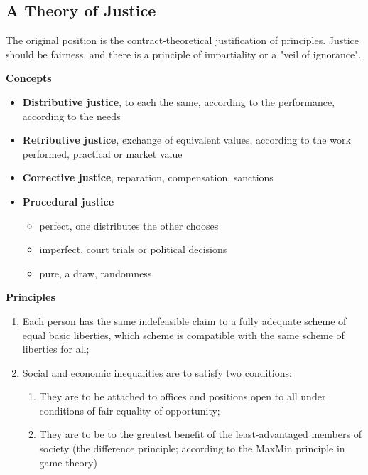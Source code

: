 \documentclass[11pt]{article}
\theoremstyle{definition}
\begin{document}
\subsection{A Theory of Justice}
The original position is the contract-theoretical justification of principles. Justice should be fairness, and there is a principle of impartiality or a "veil of ignorance".

\vspace{1em}
\noindent
\textbf{Concepts}
\begin{itemize}
	\item \textbf{Distributive justice}, to each the same, according to the performance, according to the needs
	\item \textbf{Retributive justice}, exchange of equivalent values, according to the work performed, practical or market value
	\item \textbf{Corrective justice}, reparation, compensation, sanctions
	\item \textbf{Procedural justice}
	\begin{itemize}
		\item perfect, one distributes the other chooses
		\item imperfect, court trials or political decisions
		\item pure, a draw, randomness
	\end{itemize}
\end{itemize}
\vspace{1em}
\noindent
\textbf{Principles}
\begin{enumerate}
	\item Each person has the same indefeasible claim to a fully adequate scheme of equal basic liberties, which scheme is compatible with the same scheme of liberties for all;
	\item Social and economic inequalities are to satisfy two conditions:
	\begin{enumerate}
		\item They are to be attached to offices and positions open to all under conditions of fair equality of opportunity;
		\item They are to be to the greatest benefit of the least-advantaged members of society (the difference principle; according to the MaxMin principle in game theory)
	\end{enumerate}
\end{enumerate}
\end{document}
